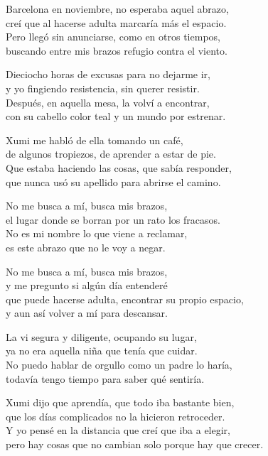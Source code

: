 \begin{lyrics}
Barcelona en noviembre, no esperaba aquel abrazo,\\
creí que al hacerse adulta marcaría más el espacio.\\
Pero llegó sin anunciarse, como en otros tiempos,\\
buscando entre mis brazos refugio contra el viento.

Dieciocho horas de excusas para no dejarme ir,\\
y yo fingiendo resistencia, sin querer resistir.\\
Después, en aquella mesa, la volví a encontrar,\\
con su cabello color teal y un mundo por estrenar.

Xumi me habló de ella tomando un café,\\
de algunos tropiezos, de aprender a estar de pie.\\
Que estaba haciendo las cosas, que sabía responder,\\
que nunca usó su apellido para abrirse el camino.

No me busca a mí, busca mis brazos,\\
el lugar donde se borran por un rato los fracasos.\\
No es mi nombre lo que viene a reclamar,\\
es este abrazo que no le voy a negar.

No me busca a mí, busca mis brazos,\\
y me pregunto si algún día entenderé\\
que puede hacerse adulta, encontrar su propio espacio,\\
y aun así volver a mí para descansar.

La vi segura y diligente, ocupando su lugar,\\
ya no era aquella niña que tenía que cuidar.\\
No puedo hablar de orgullo como un padre lo haría,\\
todavía tengo tiempo para saber qué sentiría.

Xumi dijo que aprendía, que todo iba bastante bien,\\
que los días complicados no la hicieron retroceder.\\
Y yo pensé en la distancia que creí que iba a elegir,\\
pero hay cosas que no cambian solo porque hay que crecer.


\end{lyrics}
